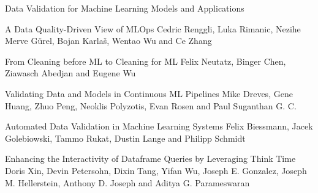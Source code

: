 \documentclass[11pt]{article}
\begin{document}
\begin{bulletin}
\begin{articlesection}{Data Validation for Machine Learning Models and Applications}
%
%


% 


\begin{article}
{A Data Quality-Driven View of MLOps}
{Cedric Renggli, Luka Rimanic, Nezihe Merve Gürel, Bojan Karlaš, Wentao Wu and Ce Zhang}

\end{article}

\begin{article}
{From Cleaning before ML to Cleaning for ML}
{Felix Neutatz, Binger Chen, Ziawasch Abedjan and Eugene Wu}

\end{article}

\begin{article}
{Validating Data and Models in Continuous ML Pipelines}
{Mike Dreves, Gene Huang, Zhuo Peng, Neoklis Polyzotis, Evan Rosen and Paul Suganthan G. C.}

\end{article}


\begin{article}
{Automated Data Validation in Machine Learning Systems}
{Felix Biessmann, Jacek Golebiowski, Tammo Rukat, Dustin Lange and Philipp Schmidt}

\end{article}

\begin{article}
{Enhancing the Interactivity of Dataframe Queries by Leveraging Think Time}
{Doris Xin, Devin Petersohn, Dixin Tang, Yifan Wu, Joseph E. Gonzalez, Joseph M. Hellerstein, Anthony D. Joseph and Aditya G. Parameswaran}

\end{article}


\end{articlesection}
\end{bulletin}
\end{document}
